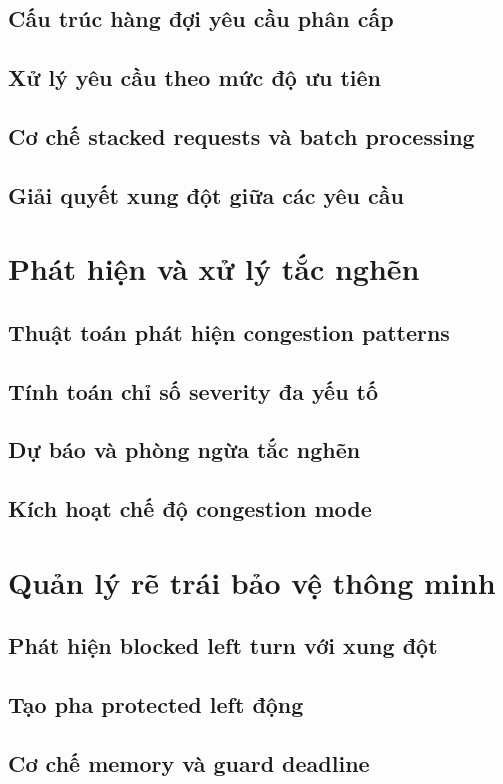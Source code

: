 \documentclass[12pt,a4paper,oneside]{report}
\begin{document}
\subsection{Cấu trúc hàng đợi yêu cầu phân cấp}
\subsection{Xử lý yêu cầu theo mức độ ưu tiên}
\subsection{Cơ chế stacked requests và batch processing}
\subsection{Giải quyết xung đột giữa các yêu cầu}

\section{Phát hiện và xử lý tắc nghẽn}
\subsection{Thuật toán phát hiện congestion patterns}
\subsection{Tính toán chỉ số severity đa yếu tố}
\subsection{Dự báo và phòng ngừa tắc nghẽn}
\subsection{Kích hoạt chế độ congestion mode}

\section{Quản lý rẽ trái bảo vệ thông minh}
\subsection{Phát hiện blocked left turn với xung đột}
\subsection{Tạo pha protected left động}
\subsection{Cơ chế memory và guard deadline}
\end{document}
